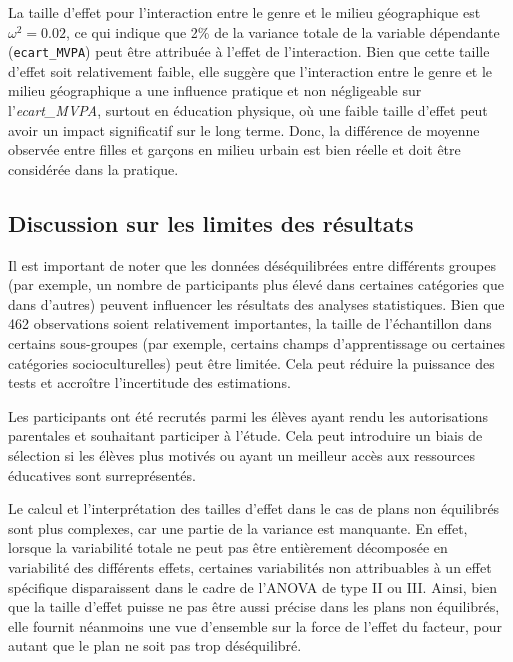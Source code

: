 \documentclass[12pt,a4paper]{article}
\begin{document}
\begin{enumerate}[label=\textbf{\alph*})]
La taille d'effet pour l'interaction entre le genre et le milieu géographique est $\omega^2 = 0.02$, ce qui indique que 2\% de la variance totale de la variable dépendante (\texttt{ecart\_MVPA}) peut être attribuée à l'effet de l'interaction. Bien que cette taille d'effet soit relativement faible, elle suggère que l'interaction entre le genre et le milieu géographique a une influence pratique et non négligeable sur l'\textit{ecart\_MVPA}, surtout en éducation physique, où une faible taille d'effet peut avoir un impact significatif sur le long terme. Donc, la différence de moyenne observée entre filles et garçons en milieu urbain est bien réelle et doit être considérée dans la pratique.

\end{enumerate}

\subsection{Discussion sur les limites des résultats}

Il est important de noter que les données déséquilibrées entre différents groupes (par exemple, un nombre de participants plus élevé dans certaines catégories que dans d'autres) peuvent influencer les résultats des analyses statistiques. Bien que 462 observations soient relativement importantes, la taille de l'échantillon dans certains sous-groupes (par exemple, certains champs d'apprentissage ou certaines catégories socioculturelles) peut être limitée. Cela peut réduire la puissance des tests et accroître l'incertitude des estimations.

Les participants ont été recrutés parmi les élèves ayant rendu les autorisations parentales et souhaitant participer à l'étude. Cela peut introduire un biais de sélection si les élèves plus motivés ou ayant un meilleur accès aux ressources éducatives sont surreprésentés.

Le calcul et l'interprétation des tailles d'effet dans le cas de plans non équilibrés sont plus complexes, car une partie de la variance est manquante. En effet, lorsque la variabilité totale ne peut pas être entièrement décomposée en variabilité des différents effets, certaines variabilités non attribuables à un effet spécifique disparaissent dans le cadre de l'ANOVA de type II ou III. Ainsi, bien que la taille d'effet puisse ne pas être aussi précise dans les plans non équilibrés, elle fournit néanmoins une vue d'ensemble sur la force de l'effet du facteur, pour autant que le plan ne soit pas trop déséquilibré.
\end{document}

